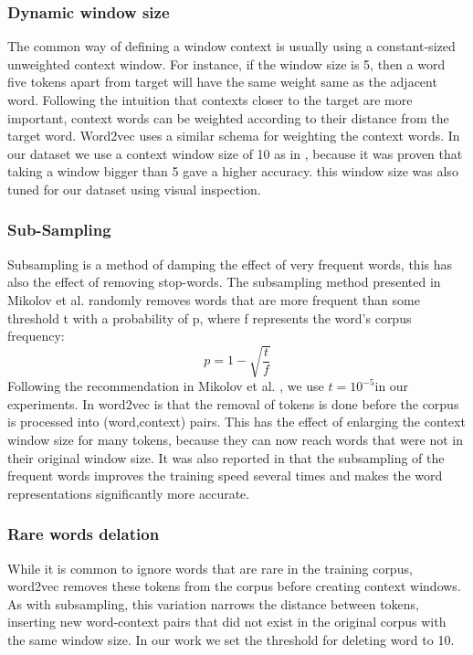 \documentclass{article}
\begin{document}
\subsubsection{Dynamic window size}
The common way of defining a window context is usually using a constant-sized unweighted context window. For instance, if the window size is 5, then a word five tokens apart from target will have the same weight same as the adjacent word.
Following the intuition that contexts closer to the target are more important, context words can be weighted according to their distance from the target word. Word2vec uses a similar schema for weighting the context words. In our dataset we use a context window size of 10 as in \cite{mikolov:2013}, because it was proven that taking a window bigger than 5 gave a higher accuracy. this window size was also tuned for our dataset using visual inspection.  \\
\subsubsection{Sub-Sampling}
Subsampling is a method of damping the effect of  very frequent words, this has also the effect of removing stop-words. The subsampling method presented in Mikolov et al. \cite{mikolov:2013} randomly removes words that are more frequent than some threshold t with a probability of p, where f represents the word’s corpus frequency:
$$ p=1-\sqrt{\frac{t}{f}} $$
Following the recommendation in Mikolov et al. \cite{mikolov:2013}, we use $t = 10^{-5}$in our experiments.
In word2vec is that the removal of tokens is done before the corpus is processed into (word,context)
pairs. This has the effect of enlarging the context window size for many tokens, because they can now reach words that were not in their original window size.
It was also reported in \cite{mikolov:2013} that the subsampling of the frequent words improves the training speed several times and makes the word representations significantly more accurate.
\subsubsection{Rare words delation}
While it is common to ignore words that are rare in the training corpus, word2vec removes these tokens from the corpus before creating context windows. As with subsampling, this variation narrows the distance between tokens, inserting new word-context
pairs that did not exist in the original corpus with the same window size. In our work we set the threshold for deleting word to 10.
\end{document}
